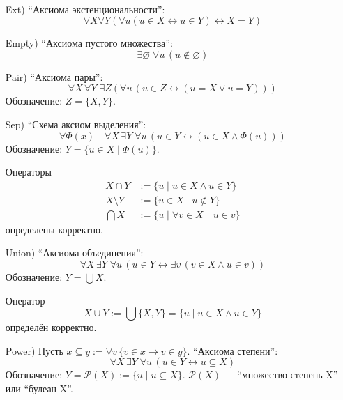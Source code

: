 \documentclass[12pt,a4paper]{article}
\newcommand{\Pcal}{\ensuremath{\mathcal{P}}\xspace}
\begin{document}
    \begin{definition}[аксиомы ZFC (= ZF (аксиомы Цермело-Френкеля) + C (аксиома выбора))]\ 
        \begin{itemize}
            \item[Ext)] ``Аксиома экстенциональности'':
                \[\forall X \forall Y (\forall u (u \in X \leftrightarrow u \in Y) \leftrightarrow X=Y)\]
            \item[Empty)] ``Аксиома пустого множества'':
                \[\exists \varnothing\; \forall u\, (u \notin \varnothing)\]
            \item[Pair)] ``Аксиома пары'':
                \[\forall X\, \forall Y\; \exists Z (\forall u\, (u \in Z \leftrightarrow (u = X \vee u = Y)))\]
                Обозначение: $Z = \{X, Y\}$.
            \item[Sep)] ``Схема аксиом выделения'':
                \[\forall \Phi(x)\quad \forall X\, \exists Y\; \forall u\, (u\in Y \leftrightarrow (u \in X \wedge \Phi(u)))\]
                Обозначение: $Y = \{u \in X \mid \Phi(u)\}$.

                \begin{corollary*}
                    Операторы
                    \begin{align*}
                        X \cap Y &:= \{u \mid u \in X \wedge u \in Y\}\\
                        X \setminus Y &:= \{u \in X \mid u \notin Y\}\\
                        \bigcap X &:= \{u \mid \forall v \in X \quad u \in v\}
                    \end{align*}
                    определены корректно.
                \end{corollary*}
            \item[Union)] ``Аксиома объединения'':
                \[\forall X\, \exists Y\; \forall u\, (u \in Y \leftrightarrow \exists v\, (v \in X \wedge u \in v))\]
                Обозначение: $Y=\bigcup X$.

                \begin{corollary*}
                    Оператор
                    \[
                        X \cup Y := \bigcup \{X, Y\} = \{u \mid u \in X \wedge u \in Y\}
                    \]
                    определён корректно.
                \end{corollary*}
            \item[Power)] Пусть $x \subseteq y := \forall v\, \{v \in x \rightarrow v \in y\}$. ``Аксиома степени'':
                \[
                    \forall X\, \exists Y\; \forall u\, (u \in Y \leftrightarrow u \subseteq X)
                \]
                Обозначение: $Y = \Pcal(X) := \{u \mid u \subseteq X\}$.
                $\Pcal(X)$ --- ``множество-степень X'' или ``булеан X''.


\end{itemize}
\end{definition}
\end{document}
